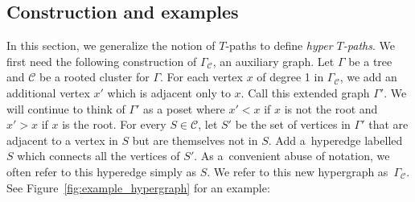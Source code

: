 \documentclass[pdftex]{sigma}
\numberwithin{equation}{section}
\begin{document}
\subsection{Construction and examples}\label{sec:gen-T-paths}
In this section, we generalize the notion of $T$-paths to define \emph{hyper $T$-paths}. We first need the following construction of $\Gamma_{\mathcal{C}}$, an auxiliary graph.
Let $\Gamma$ be a tree and $\mathcal{C}$ be a rooted cluster for $\Gamma$. For each vertex $x$ of degree 1 in $\Gamma_{\mathcal{C}}$, we add an additional vertex $x'$ which is adjacent only to $x$. Call this extended graph $\Gamma'$. We will continue to think of $\Gamma'$ as a poset where $x'<x$ if $x$ is not the root and $x'>x$ if $x$ is the root. For every $S\in\mathcal{C}$, let $S'$ be the set of vertices in $\Gamma'$ that are adjacent to a vertex in $S$ but are themselves not in $S$. Add a~hyperedge labelled $S$ which connects all the vertices of $S'$. As a~convenient abuse of notation, we often refer to this hyperedge simply as $S$. We refer to this new hypergraph as~$\Gamma_{\mathcal{C}}$. See Figure~\ref{fig:example_hypergraph} for an example:
\end{document}
